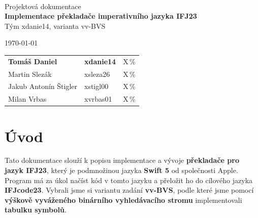 \documentclass[a4paper, 12pt]{article} %
\begin{document}
        \begin{titlepage}
            \begin{center}
         \\
                \Huge{Projektová dokumentace} \\
                \Large{\textbf{Implementace překladače imperativního jazyka IFJ23}} \\
                \large{Tým xdanie14, varianta vv-BVS}
            \end{center}

        {\large \today \hfill
        \large
        \begin{tabular}{l l l}
        \textbf{Tomáš Daniel} & \quad \textbf{xdanie14} & \quad X\,\% \\
        Martin Slezák         & \quad xsleza26          & \quad X\,\% \\
        Jakub Antonín Štigler & \quad xstigl00          & \quad X\,\% \\
        Milan Vrbas           & \quad xvrbas01          & \quad X\,\% \\
        \end{tabular}
        }
    \end{titlepage}

    \tableofcontents
    \thispagestyle{empty}
    \newpage

    \setcounter{page}{1}
    \section{Úvod}
    Tato dokumentace slouží k popisu implementace a vývoje \textbf{překladače pro jazyk IFJ23}, 
    který je podmnožinou jazyka \textbf{Swift 5} od společnosti Apple. Program má za úkol načíst 
    kód v tomto jazyku a přeložit ho do cílového jazyka \textbf{IFJcode23}. Vybrali jsme si variantu 
    zadání \textbf{vv-BVS}, podle které jsme pomocí \textbf{výškově vyváženého binárního 
    vyhledávacího stromu} implementovali \textbf{tabulku symbolů}.
\end{document}
